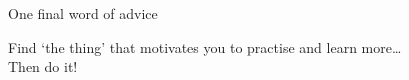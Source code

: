\begin{frame}{One final word of advice}
    \begin{center}
        {\large%
         Find `the thing' that motivates \alert{you} to practise and learn
         more\ldots} \\[2\bigskipamount]
        {\Huge%
         Then \alert{do it}!}
    \end{center}
\end{frame}



